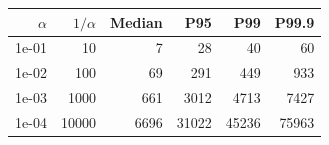 \begin{tabular}{rrrrrr}
\toprule
$\alpha$ & $1/\alpha$ & Median & P95 & P99 & P99.9 \\
\midrule
1e-01 & 10 & 7 & 28 & 40 & 60 \\
1e-02 & 100 & 69 & 291 & 449 & 933 \\
1e-03 & 1000 & 661 & 3012 & 4713 & 7427 \\
1e-04 & 10000 & 6696 & 31022 & 45236 & 75963 \\
\bottomrule
\end{tabular}
